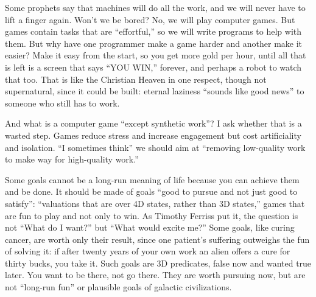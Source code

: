 
Some prophets say that machines will do all the work, and we will never have to lift a finger again. Won't we be bored? No, we will play computer games. But games contain tasks that are ``effortful,'' so we will write programs to help with them. But why have one programmer make a game harder and another make it easier? Make it easy from the start, so you get more gold per hour, until all that is left is a screen that says ``YOU WIN,'' forever, and perhaps a robot to watch that too. That is like the Christian Heaven in one respect, though not supernatural, since it could be built: eternal laziness ``sounds like good news'' to someone who still has to work. 

And what is a computer game ``except synthetic work''? I ask whether that is a wasted step. Games reduce stress and increase engagement but cost artificiality and isolation.  ``I sometimes think'' we should aim at ``removing low-quality work to make way for high-quality work.'' 

Some goals cannot be a long-run meaning of life because you can achieve them and be done. It should be made of goals ``good to pursue and not just good to satisfy'': ``valuations that are over 4D states, rather than 3D states,'' games that are fun to play and not only to win. As Timothy Ferriss put it, the question is not ``What do I want?'' but ``What would excite me?'' Some goals, like curing cancer, are worth only their result, since one patient's suffering outweighs the fun of solving it: if after twenty years of your own work an alien offers a cure for thirty bucks, you take it. Such goals are 3D predicates, false now and wanted true later. You want to be there, not go there. They are worth pursuing now, but are not ``long-run fun'' or plausible goals of galactic civilizations.

